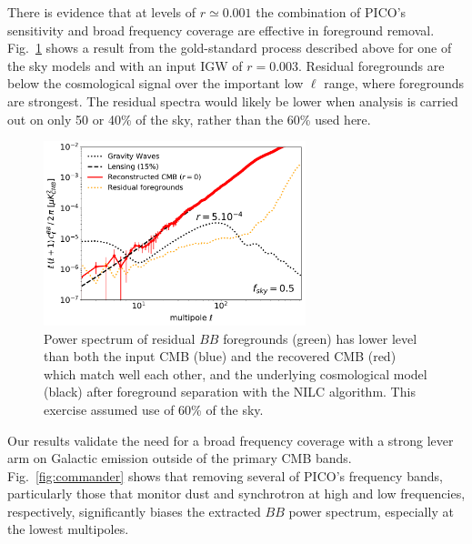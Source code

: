 \documentclass[PICOReport.tex]{subfiles}
\begin{document}
There is evidence that at levels of $r \simeq 0.001$ the combination of PICO's sensitivity and broad frequency coverage are effective in foreground removal. Fig.~\ref{fig:nilc} shows a result from the gold-standard process described above for one of the sky models and with an input \ac{IGW} of $r=0.003$. Residual foregrounds are below the cosmological signal over the important low $\ell$ range, where foregrounds are strongest. The residual spectra would likely be lower when analysis is carried out on only 50 or 40\% of the sky, rather than the 60\% used here. 

\begin{figure}
\hspace{-0.1in}
\parbox{3.0in}{\centerline {
\includegraphics[width=3.0in]{images/gnilc_pico_90p92_r0_AL0p15_mc_test3_final.pdf}}}
\hspace{0.25in}
\parbox{3.0in}{
\caption{\captiontext
Power spectrum of residual $BB$ foregrounds (green) has lower level than both the input CMB (blue) and the recovered CMB (red) which match well each other, and the underlying cosmological model (black) after foreground separation with the NILC algorithm. This exercise assumed use of 60\% of the sky.   
\label{fig:nilc}}}
\vspace{-0.1in}
\end{figure}

Our results validate the need for a broad frequency coverage with a strong lever arm on Galactic emission outside of the primary CMB bands. Fig.~\ref{fig:commander} shows that removing several of PICO's frequency bands, particularly those that monitor dust and synchrotron at high and low frequencies, respectively, significantly biases the extracted $BB$ power spectrum, especially at the lowest multipoles. 
\end{document}
